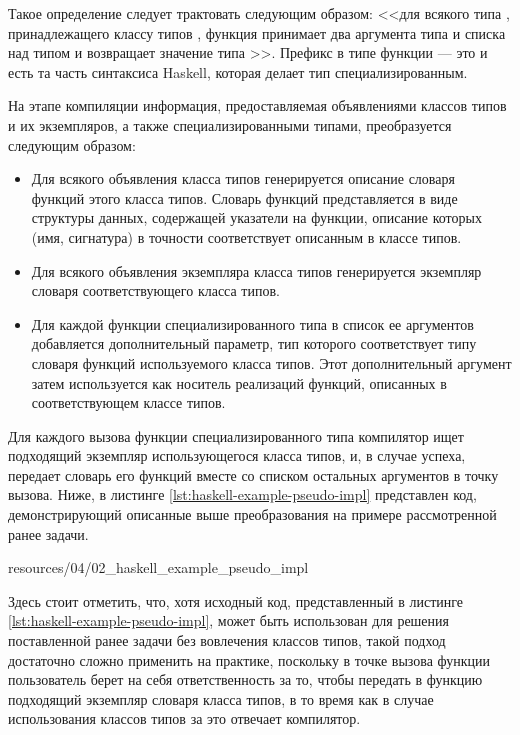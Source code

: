 Такое определение следует трактовать следующим образом: <<для всякого типа , принадлежащего классу типов , функция  принимает два аргумента типа  и списка над типом  и возвращает значение типа >>. Префикс  в типе функции  --- это и есть та часть синтаксиса Haskell, которая делает тип специализированным.

На этапе компиляции информация, предоставляемая объявлениями классов типов и их экземпляров, а также специализированными типами, преобразуется следующим образом:
\begin{itemize}
    \item Для всякого объявления класса типов генерируется описание словаря функций этого класса типов. Словарь функций представляется в виде структуры данных, содержащей указатели на функции, описание которых (имя, сигнатура) в точности соответствует описанным в классе типов. 
    \item Для всякого объявления экземпляра класса типов генерируется экземпляр словаря соответствующего класса типов. 
    \item Для каждой функции специализированного типа в список ее аргументов добавляется дополнительный параметр, тип которого соответствует типу словаря функций используемого класса типов. Этот дополнительный аргумент затем используется как носитель реализаций функций, описанных в соответствующем классе типов. 
\end{itemize}
Для каждого вызова функции специализированного типа компилятор ищет подходящий экземпляр использующегося класса типов, и, в случае успеха, передает словарь его функций вместе со списком остальных аргументов в точку вызова. Ниже, в листинге \ref{lst:haskell-example-pseudo-impl} представлен код, демонстрирующий описанные выше преобразования на примере рассмотренной ранее задачи. 


{resources/04/02_haskell_example_pseudo_impl}

Здесь стоит отметить, что, хотя исходный код, представленный в листинге \ref{lst:haskell-example-pseudo-impl}, может быть использован для решения поставленной ранее задачи без вовлечения классов типов, такой подход достаточно сложно применить на практике, поскольку в точке вызова функции  пользователь берет на себя ответственность за то, чтобы передать в функцию подходящий экземпляр словаря класса типов, в то время как в случае использования классов типов за это отвечает компилятор. 

